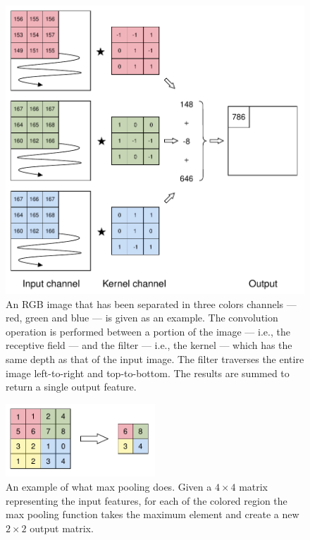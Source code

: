             \begin{figure}
                \centering
                \includegraphics[width=\textwidth]{images/convolution.pdf}
                \caption{An RGB image that has been separated in three colors channels --- red, green and blue --- is given as an example. The convolution operation is performed between a portion of the image --- i.e., the receptive field --- and the filter --- i.e., the kernel --- which has the same depth as that of the input image. The filter traverses the entire image left-to-right and top-to-bottom. The results are summed to return a single output feature.}
                \label{convolution}
            \end{figure}
            
            \begin{figure}
                \centering
                \includegraphics[width=0.5\textwidth]{images/pooling.pdf}
                \caption{An example of what max pooling does. Given a \(4 \times 4\) matrix representing the input features, for each of the colored region the max pooling function takes the maximum element and create a new \(2 \times 2\) output matrix.}
                \label{pooling}
            \end{figure}
            
